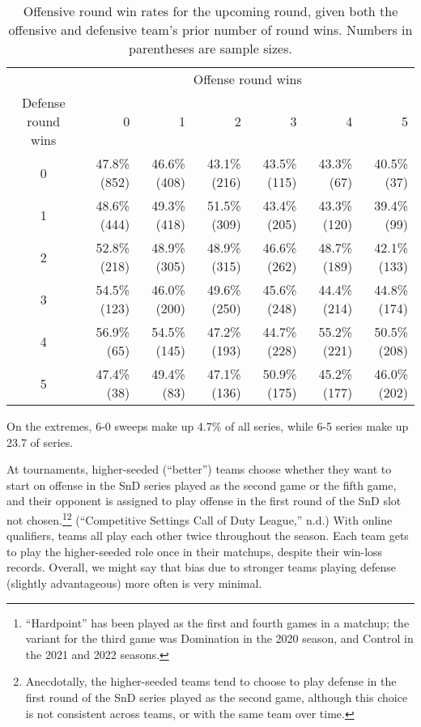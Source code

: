 \documentclass{article}
\begin{document}
\begin{longtable}{crrrrrr}
\caption{Offensive round win rates for the upcoming round, given both the offensive and defensive team's prior number of round wins. Numbers in parentheses are sample sizes.}\label{tbl:cod-o-win-prop-by-series-state} \\
\toprule
& \multicolumn{6}{c}{Offense round wins} \\ 
\cmidrule(lr){2-7}
Defense round wins & 0 & 1 & 2 & 3 & 4 & 5 \\ 
\midrule
0 & 47.8\%
(852) & 46.6\%
(408) & 43.1\%
(216) & 43.5\%
(115) & 43.3\%
(67) & 40.5\%
(37) \\ 
1 & 48.6\%
(444) & 49.3\%
(418) & 51.5\%
(309) & 43.4\%
(205) & 43.3\%
(120) & 39.4\%
(99) \\ 
2 & 52.8\%
(218) & 48.9\%
(305) & 48.9\%
(315) & 46.6\%
(262) & 48.7\%
(189) & 42.1\%
(133) \\ 
3 & 54.5\%
(123) & 46.0\%
(200) & 49.6\%
(250) & 45.6\%
(248) & 44.4\%
(214) & 44.8\%
(174) \\ 
4 & 56.9\%
(65) & 54.5\%
(145) & 47.2\%
(193) & 44.7\%
(228) & 55.2\%
(221) & 50.5\%
(208) \\ 
5 & 47.4\%
(38) & 49.4\%
(83) & 47.1\%
(136) & 50.9\%
(175) & 45.2\%
(177) & 46.0\%
(202) \\ 
\bottomrule
\end{longtable}

On the extremes, 6-0 sweeps make up 4.7\% of all series, while 6-5
series make up 23.7 of series.

At tournaments, higher-seeded (``better'') teams choose whether they
want to start on offense in the SnD series played as the second game or
the fifth game, and their opponent is assigned to play offense in the
first round of the SnD slot not chosen.\footnote{``Hardpoint'' has been
  played as the first and fourth games in a matchup; the variant for the
  third game was Domination in the 2020 season, and Control in the 2021
  and 2022 seasons.}\footnote{Anecdotally, the higher-seeded teams tend
  to choose to play defense in the first round of the SnD series played
  as the second game, although this choice is not consistent across
  teams, or with the same team over time.} ({``Competitive Settings
\textbar{} Call of Duty League,''} n.d.) With online qualifiers, teams
all play each other twice throughout the season. Each team gets to play
the higher-seeded role once in their matchups, despite their win-loss
records. Overall, we might say that bias due to stronger teams playing
defense (slightly advantageous) more often is very minimal.
\end{document}
